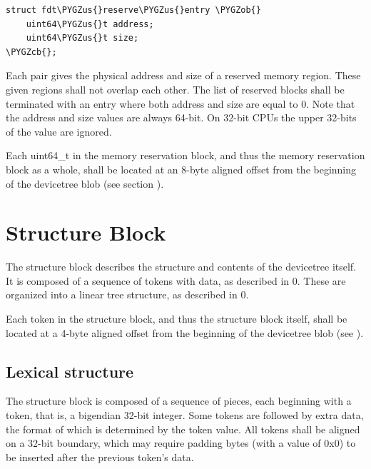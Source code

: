 \documentclass[a4paper,10pt,oneside]{sphinxmanual}
\def\PYGZus{\char`\_}
\def\PYGZob{\char`\{}
\def\PYGZcb{\char`\}}
\begin{document}
\begin{Verbatim}[commandchars=\\\{\}]
struct fdt\PYGZus{}reserve\PYGZus{}entry \PYGZob{}
    uint64\PYGZus{}t address;
    uint64\PYGZus{}t size;
\PYGZcb{};
\end{Verbatim}

Each pair gives the physical address and size of a reserved memory
region. These given regions shall not overlap each other. The list of
reserved blocks shall be terminated with an entry where both address and
size are equal to 0. Note that the address and size values are always
64-bit. On 32-bit CPUs the upper 32-bits of the value are ignored.

Each uint64\_t in the memory reservation block, and thus the memory
reservation block as a whole, shall be located at an 8-byte aligned
offset from the beginning of the devicetree blob (see section
{\hyperref[flattened\string-format:sect\string-fdt\string-alignment]{}}).


\section{Structure Block}
\label{flattened-format:sect-fdt-structure-block}\label{flattened-format:structure-block}
The structure block describes the structure and contents of the devicetree
itself. It is composed of a sequence of tokens with data, as
described in 0. These are organized into a linear tree structure, as
described in 0.

Each token in the structure block, and thus the structure block itself,
shall be located at a 4-byte aligned offset from the beginning of the
devicetree blob (see {\hyperref[flattened\string-format:sect\string-fdt\string-alignment]{}}).


\subsection{Lexical structure}
\label{flattened-format:lexical-structure}\label{flattened-format:sect-fdt-lexical-structure}
The structure block is composed of a sequence of pieces, each beginning
with a token, that is, a bigendian 32-bit integer. Some tokens are
followed by extra data, the format of which is determined by the token
value. All tokens shall be aligned on a 32-bit boundary, which may
require padding bytes (with a value of 0x0) to be inserted after the
previous token’s data.
\end{document}
